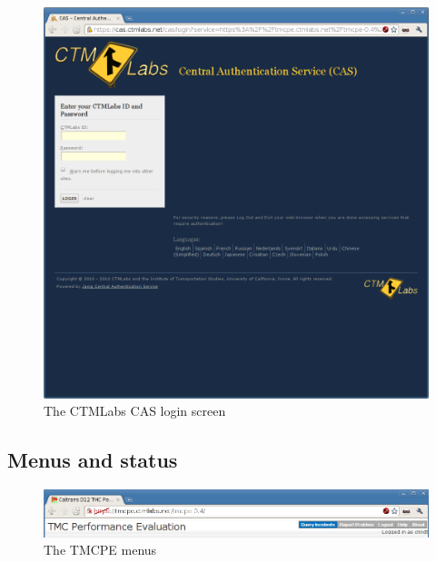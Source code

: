 \documentclass[12pt]{report}
\begin{document}
\begin{figure}[t]
  \begin{center}
    \includegraphics[width=\textwidth]{images/ctmlabs-login.png}
    \caption{The CTMLabs CAS login screen}
    \label{fig:ctmlabs-login}
  \end{center}
\end{figure}


\subsection{Menus and status}
\label{sec:ui-menu}


\begin{figure}[t]
  \begin{center}
    \includegraphics[width=\textwidth]{images/tmcpe-menu.png}
    \caption{The TMCPE menus}
    \label{fig:tmcpe-menu}
  \end{center}
\end{figure}
\end{document}
